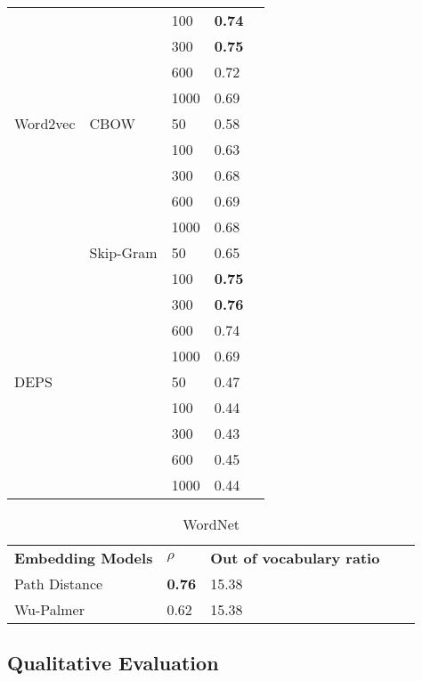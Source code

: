 \begin{table}[]
\begin{minipage}{.5\textwidth}
\begin{tabular}{@{}lllll@{}}
                 &               & 100  & \textbf{0.74}    \\
                 &               & 300  & \textbf{0.75}    \\
                 &               & 600  & 0.72             \\
                 &               & 1000 & 0.69             \\ \cmidrule(r){1-4}
Word2vec         & CBOW          & 50   & 0.58             \\
                 &               & 100  & 0.63             \\
                 &               & 300  & 0.68             \\
                 &               & 600  & 0.69             \\
                 &               & 1000 & 0.68             \\ \cmidrule(lr){2-4}
                 & Skip-Gram     & 50   & 0.65             \\
                 &               & 100  & \textbf{0.75}    \\
                 &               & 300  & \textbf{0.76}    \\
                 &               & 600  & 0.74             \\
                 &               & 1000 & 0.69             \\ \cmidrule(r){1-4}
DEPS             &               & 50   & 0.47             \\
                 &               & 100  & 0.44             \\
                 &               & 300  & 0.43             \\
                 &               & 600  & 0.45             \\
                 &               & 1000 & 0.44             \\ \cmidrule(r){1-4}
\end{tabular}
\end{minipage}
\end{table}



\begin{table}[]
\caption{WordNet}
\label{tab:worneteval}
\centering%
\begin{minipage}{.6\textwidth}
\begin{tabular}{@{}lllll@{}}
\cmidrule(r){1-5}
\textbf{Embedding Models} & \textbf{$\rho$}          & \textbf{Out of vocabulary ratio} \\ 
\cmidrule(r){1-3}
Path Distance & \textbf{0.76}    & 15.38                   \\
Wu-Palmer     & 0.62             & 15.38                   \\ \cmidrule(r){1-3}
\end{tabular}
\end{minipage}
\end{table}

\subsection{Qualitative Evaluation}\label{chap:results:quantitative}
